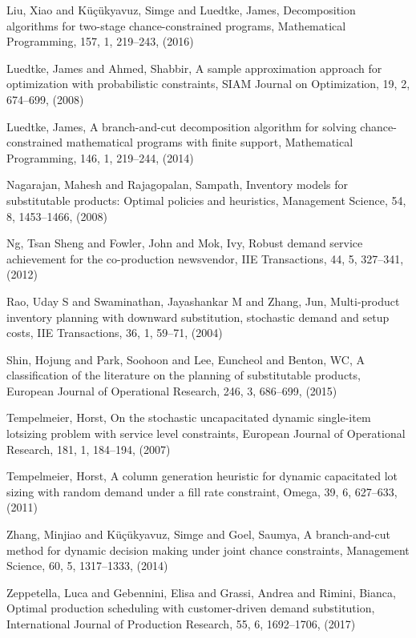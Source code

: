 \documentclass[11pt]{article}
\begin{document}
\begin{thebibliography}{99}
Liu, Xiao and K{\"u}{\c{c}}{\"u}kyavuz, Simge and Luedtke, James, 
Decomposition algorithms for two-stage chance-constrained programs, Mathematical Programming, 157,
  1, 219--243, (2016)
 

Luedtke, James and Ahmed, Shabbir, A sample approximation approach for optimization with probabilistic constraints, 
SIAM Journal on Optimization, 19,
2, 674--699, (2008)


  Luedtke, James, A branch-and-cut decomposition algorithm for solving chance-constrained mathematical programs with finite support,
  Mathematical Programming, 146, 1, 219--244,
 (2014)

Nagarajan, Mahesh and Rajagopalan, Sampath,
Inventory models for substitutable products: Optimal policies and heuristics, Management Science, 54, 8, 1453--1466,
(2008)

Ng, Tsan Sheng and Fowler, John and Mok, Ivy, Robust demand service achievement for the co-production newsvendor, IIE Transactions,
  44,
  5,
 327--341,
  (2012)
  
 Rao, Uday S and Swaminathan, Jayashankar M and Zhang, Jun,
 Multi-product inventory planning with downward substitution, stochastic demand and setup costs,
 IIE Transactions, 36, 1, 59--71, (2004)
 
 
 Shin, Hojung and Park, Soohoon and Lee, Euncheol and Benton, WC, A classification of the literature on the planning of substitutable products, European Journal of Operational Research, 246, 3, 686--699, (2015)
 
 
Tempelmeier, Horst, On the stochastic uncapacitated dynamic single-item lotsizing problem with service level constraints, European Journal of Operational Research, 181, 1, 184--194, (2007)
 

Tempelmeier, Horst, A column generation heuristic for dynamic capacitated lot sizing with random demand under a fill rate constraint, Omega, 39, 6, 627--633, (2011)
 
 Zhang, Minjiao and K{\"u}{\c{c}}{\"u}kyavuz, Simge and Goel, Saumya, A branch-and-cut method for dynamic decision making under joint chance constraints,
  Management Science,
  60, 5, 1317--1333, (2014)
 

Zeppetella, Luca and Gebennini, Elisa and Grassi, Andrea and Rimini, Bianca, Optimal production scheduling with customer-driven demand substitution, International Journal of Production Research, 55, 6, 1692--1706, (2017)
 



\end{thebibliography}
\end{document}
